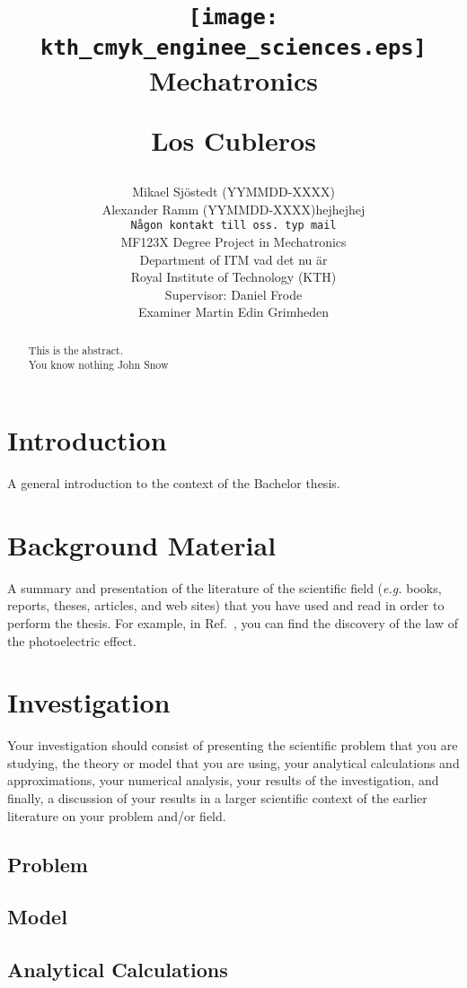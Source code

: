 \documentclass[12pt]{report}
\title{\vspace{-2.5cm}
\begin{center}
\texttt{[image: kth\_cmyk\_enginee\_sciences.eps]}\\[-1mm]
\hspace{-3mm} {\tiny {\sf Mechatronics}}
\end{center}
\vspace{5cm}
Los Cubleros}
\author{Mikael Sjöstedt (YYMMDD-XXXX) \\ Alexander Ramm (YYMMDD-XXXX)hejhejhej\\
{\tt Någon kontakt till oss. typ mail}\\
MF123X Degree Project in Mechatronics\\
Department of ITM vad det nu är \\
Royal Institute of Technology (KTH)\\
Supervisor: Daniel Frode \\
Examiner Martin Edin Grimheden}
\begin{document}
\maketitle

\begin{abstract}
This is the abstract. \\ You know nothing John Snow
\end{abstract}

\tableofcontents

\chapter{Introduction}

A general introduction to the context of the Bachelor thesis.

\chapter{Background Material}

A summary and presentation of the literature of the scientific field
({\it e.g.}  books, reports, theses, articles, and web sites) that you
have used and read in order to perform the thesis. For example, in
Ref.~\cite{einstein}, you can find the discovery of the law of the
photoelectric effect.

\chapter{Investigation}

Your investigation should consist of presenting the scientific problem
that you are studying, the theory or model that you are using, your
analytical calculations and approximations, your numerical analysis,
your results of the investigation, and finally, a discussion of your
results in a larger scientific context of the earlier literature on
your problem and/or field.

\section{Problem}

\section{Model}

\section{Analytical Calculations}
\end{document}
